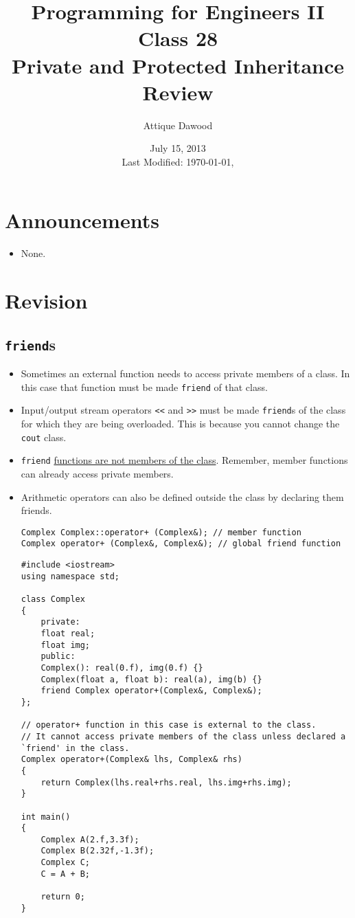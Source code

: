 \documentclass[12pt,a4paper]{article}
\title{\vspace{-2cm}Programming for Engineers II\\Class 28\\Private and Protected Inheritance\\Review}
\author{Attique Dawood}
\date{July 15, 2013\\[0.2cm] Last Modified: \today, \currenttime}
\begin{document}
\maketitle
\section{Announcements}
\begin{itemize}
\item None.
\end{itemize}
\section{Revision}
\subsection{\texttt{friend}s}
\begin{itemize}
\item Sometimes an external function needs to access private members of a class. In this case that function must be made \verb|friend| of that class.
\item Input/output stream operators \verb|<<| and \verb|>>| must be made \verb|friend|s of the class for which they are being overloaded. This is because you cannot change the \verb|cout| class.
\item \verb|friend| \underline{functions are not members of the class}. Remember, member functions can already access private members.
\item Arithmetic operators can also be defined outside the class by declaring them friends.
\begin{lstlisting}[caption={operator+ prototype as member function and as \texttt{friend}}]
Complex Complex::operator+ (Complex&); // member function
Complex operator+ (Complex&, Complex&); // global friend function
\end{lstlisting}
\begin{lstlisting}[caption={operator+ implemented as \texttt{friend}}]
#include <iostream>
using namespace std;

class Complex
{
	private:
	float real;
	float img;
	public:
	Complex(): real(0.f), img(0.f) {}
	Complex(float a, float b): real(a), img(b) {}
	friend Complex operator+(Complex&, Complex&);
};

// operator+ function in this case is external to the class.
// It cannot access private members of the class unless declared a `friend' in the class.
Complex operator+(Complex& lhs, Complex& rhs)
{
	return Complex(lhs.real+rhs.real, lhs.img+rhs.img);
}

int main()
{
	Complex A(2.f,3.3f);
	Complex B(2.32f,-1.3f);
	Complex C;
	C = A + B;

	return 0;
}
\end{lstlisting}
\end{itemize}
\end{document}

